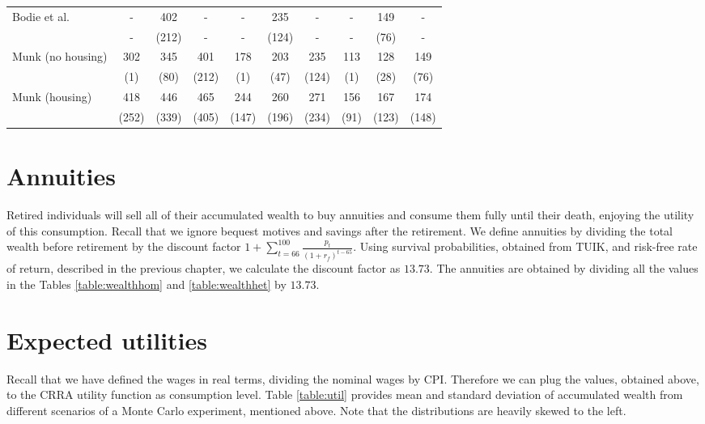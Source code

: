 \begin{table}[h!]
\begin{tabular}[c]{|l|ccc|ccc|ccc|}
		\hline
Bodie et al.			 	&-&  402&-&-&  235&-&-& 149&- \\
							&-&  (212)&-&-&  (124)&-&-&  (76)&- \\
Munk (no housing)			&  302&  345&  401&  178&  203&  235&  113&  128&  149\\
							&    (1)&   (80)&  (212)&    (1)&   (47)&  (124)&    (1)&   (28)&   (76)\\
Munk (housing)				&  418&  446&  465&  244&  260&  271&  156&  167&  174\\
							&  (252)&  (339)&  (405)&  (147)&  (196)&  (234)&   (91)&  (123)&  (148)\\
	\hline
	\end{tabular}
\end{table}
\restoregeometry

\section{Annuities}

Retired individuals will sell all of their accumulated wealth to buy annuities and consume them fully until their death, enjoying the utility of this consumption. Recall that we ignore bequest motives and savings after the retirement. We define annuities by dividing the total wealth before retirement by the discount factor $1 + \sum^{100}_{t=66}\frac{p_t}{(1+r_f)^{t-65}}$. Using survival probabilities, obtained from TUIK, and risk-free rate of return, described in the previous chapter, we calculate the discount factor as $13.73$. The annuities are obtained by dividing all the values in the Tables \ref{table:wealthhom} and \ref{table:wealthhet} by $13.73$. 


\section{Expected utilities}
Recall that we have defined the wages in real terms, dividing the nominal wages by CPI. Therefore we can plug the values, obtained above, to the CRRA utility function as consumption level. Table \ref{table:util} provides mean and standard deviation of accumulated wealth from different scenarios of a Monte Carlo experiment, mentioned above. Note that the distributions are heavily skewed to the left.

